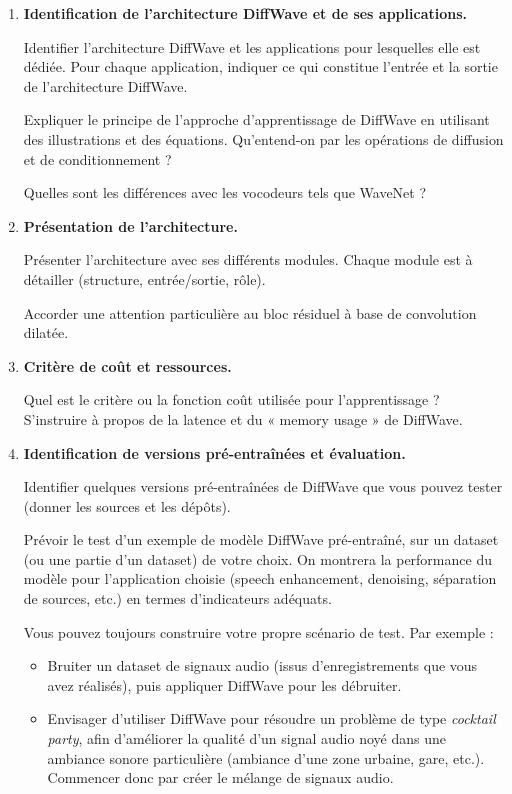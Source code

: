 \documentclass[11pt,a4paper]{article}
\begin{document}
\begin{enumerate}[label=\alph*.]

\item \textbf{Identification de l'architecture DiffWave et de ses applications.}

Identifier l'architecture DiffWave et les applications pour lesquelles
elle est dédiée. Pour chaque application, indiquer ce qui constitue
l'entrée et la sortie de l'architecture DiffWave.

Expliquer le principe de l'approche d'apprentissage de DiffWave en
utilisant des illustrations et des équations. Qu'entend-on par les
opérations de diffusion et de conditionnement ?

Quelles sont les différences avec les vocodeurs tels que WaveNet ?

\item \textbf{Présentation de l'architecture.}

Présenter l'architecture avec ses différents modules. Chaque module est
à détailler (structure, entrée/sortie, rôle).

Accorder une attention particulière au bloc résiduel à base de
convolution dilatée.

\item \textbf{Critère de coût et ressources.}

Quel est le critère ou la fonction coût utilisée pour l'apprentissage ?
S'instruire à propos de la latence et du « memory usage » de DiffWave.

\item \textbf{Identification de versions pré-entraînées et évaluation.}

Identifier quelques versions pré-entraînées de DiffWave que vous pouvez
tester (donner les sources et les dépôts).

Prévoir le test d'un exemple de modèle DiffWave pré-entraîné, sur un
dataset (ou une partie d'un dataset) de votre choix. On montrera la
performance du modèle pour l'application choisie (speech enhancement,
denoising, séparation de sources, etc.) en termes d'indicateurs adéquats.

Vous pouvez toujours construire votre propre scénario de test. Par exemple :
\begin{itemize}
    \item Bruiter un dataset de signaux audio (issus d'enregistrements
    que vous avez réalisés), puis appliquer DiffWave pour les débruiter.
    \item Envisager d'utiliser DiffWave pour résoudre un problème de type
    \textit{cocktail party}, afin d'améliorer la qualité d'un signal audio
    noyé dans une ambiance sonore particulière (ambiance d'une zone
    urbaine, gare, etc.). Commencer donc par créer le mélange de signaux
    audio.
\end{itemize}


\end{enumerate}
\end{document}
